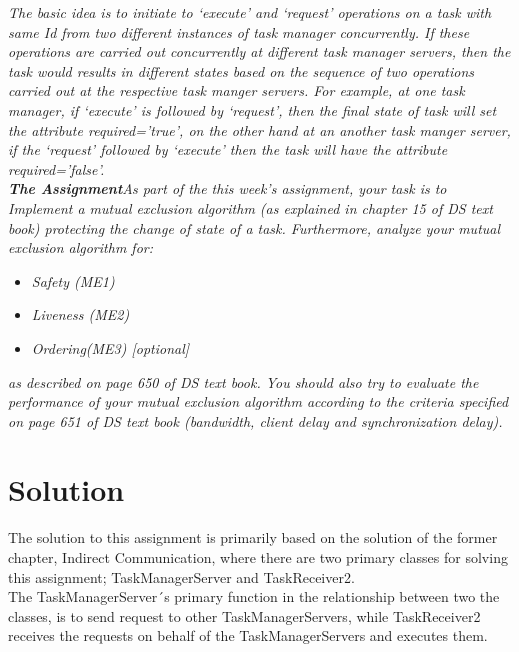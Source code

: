\textit{The basic idea is to initiate to ‘execute’ and ‘request’ operations on a task with same Id from two different instances of task manager concurrently. If these operations are carried out concurrently at different task manager servers, then the task would results in different states based on the sequence of two operations carried out at the respective task manger servers.  For example, at one task manager, if ‘execute’ is followed by ‘request’, then the final state of task will set the attribute required=’true’, on the other hand at an another task manger server, if the ‘request’ followed by ‘execute’ then the task will have the attribute required=’false’.}\\

\textit{\textbf{The Assignment}\newline As part of the this week’s assignment, your task is to Implement a mutual exclusion algorithm (as explained in chapter 15 of DS text book) protecting the change of state of a task. Furthermore, analyze your mutual exclusion algorithm for:}

\begin{itemize}
\item \textit{Safety (ME1)}
\item \textit{Liveness (ME2)}
\item \textit{Ordering(ME3) [optional]}
\end{itemize}

\textit{as described on page 650 of DS text book. You should also try to evaluate the performance of your mutual exclusion algorithm according to the criteria specified on page 651 of DS text book (bandwidth, client delay and synchronization delay).}

\section{Solution}
\label{MutualExclusion_solution}
The solution to this assignment is primarily based on the solution of the former chapter, Indirect Communication, where there are two primary classes for solving this assignment; TaskManagerServer and TaskReceiver2. \\

The TaskManagerServer´s primary function in the relationship between two the classes, is to send request to other TaskManagerServers, while TaskReceiver2 receives the requests on behalf of the TaskManagerServers and executes them. \\

